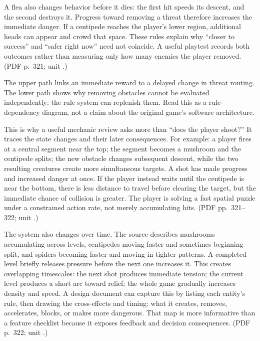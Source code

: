 A flea also changes behavior before it dies: the first hit speeds its descent, and the second destroys it. Progress toward removing a threat therefore increases the immediate danger. If a centipede reaches the player's lower region, additional heads can appear and crowd that space. These rules explain why ``closer to success'' and ``safer right now'' need not coincide. A useful playtest records both outcomes rather than measuring only how many enemies the player removed. (PDF p.~321; unit .)


The upper path links an immediate reward to a delayed change in threat routing. The lower path shows why removing obstacles cannot be evaluated independently: the rule system can replenish them. Read this as a rule-dependency diagram, not a claim about the original game's software architecture.

This is why a useful mechanic review asks more than ``does the player shoot?'' It traces the state changes and their later consequences. For example: a player fires at a central segment near the top; the segment becomes a mushroom and the centipede splits; the new obstacle changes subsequent descent, while the two resulting creatures create more simultaneous targets. A shot has made progress and increased danger at once. If the player instead waits until the centipede is near the bottom, there is less distance to travel before clearing the target, but the immediate chance of collision is greater. The player is solving a fast spatial puzzle under a constrained action rate, not merely accumulating hits. (PDF pp.~321--322; unit .)

The system also changes over time. The source describes mushrooms accumulating across levels, centipedes moving faster and sometimes beginning split, and spiders becoming faster and moving in tighter patterns. A completed level briefly releases pressure before the next one increases it. This creates overlapping timescales: the next shot produces immediate tension; the current level produces a short arc toward relief; the whole game gradually increases density and speed. A design document can capture this by listing each entity's rule, then drawing the cross-effects and timing: what it creates, removes, accelerates, blocks, or makes more dangerous. That map is more informative than a feature checklist because it exposes feedback and decision consequences. (PDF p.~322; unit .)

